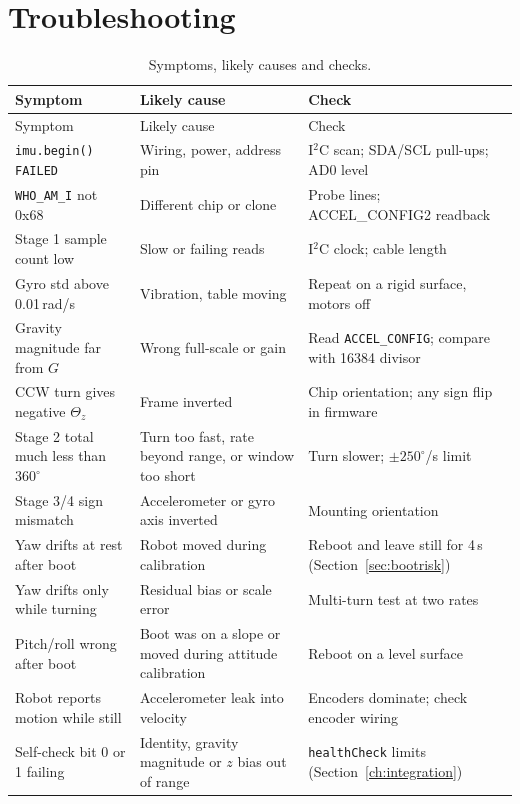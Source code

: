 \documentclass[11pt,a4paper]{report}
\newcommand{\code}[1]{\texttt{#1}}
\begin{document}
\chapter[Troubleshooting]{Troubleshooting}\label{ch:trouble}

\begin{longtable}{@{}p{4.2cm}p{4.6cm}p{5.2cm}@{}}
\caption{Symptoms, likely causes and checks.}\label{tab:trouble}\\
\toprule
Symptom & Likely cause & Check\\
\midrule
\endfirsthead
\toprule
Symptom & Likely cause & Check\\
\midrule
\endhead
\bottomrule
\endfoot
\code{imu.begin() FAILED} & Wiring, power, address pin & I$^2$C scan; SDA/SCL pull-ups; AD0 level\\
\code{WHO\_AM\_I} not 0x68 & Different chip or clone & Probe lines; ACCEL\_CONFIG2 readback\\
Stage 1 sample count low & Slow or failing reads & I$^2$C clock; cable length\\
Gyro std above 0.01\,rad/s & Vibration, table moving & Repeat on a rigid surface, motors off\\
Gravity magnitude far from $G$ & Wrong full-scale or gain & Read \code{ACCEL\_CONFIG}; compare with 16384 divisor\\
CCW turn gives negative $\Theta_z$ & Frame inverted & Chip orientation; any sign flip in firmware\\
Stage 2 total much less than $360^\circ$ & Turn too fast, rate beyond range, or window too short & Turn slower; $\pm250^\circ$/s limit\\
Stage 3/4 sign mismatch & Accelerometer or gyro axis inverted & Mounting orientation\\
Yaw drifts at rest after boot & Robot moved during calibration & Reboot and leave still for 4\,s (Section~\ref{sec:bootrisk})\\
Yaw drifts only while turning & Residual bias or scale error & Multi-turn test at two rates\\
Pitch/roll wrong after boot & Boot was on a slope or moved during attitude calibration & Reboot on a level surface\\
Robot reports motion while still & Accelerometer leak into velocity & Encoders dominate; check encoder wiring\\
Self-check bit 0 or 1 failing & Identity, gravity magnitude or $z$ bias out of range & \code{healthCheck} limits (Section~\ref{ch:integration})\\
\end{longtable}
\end{document}

